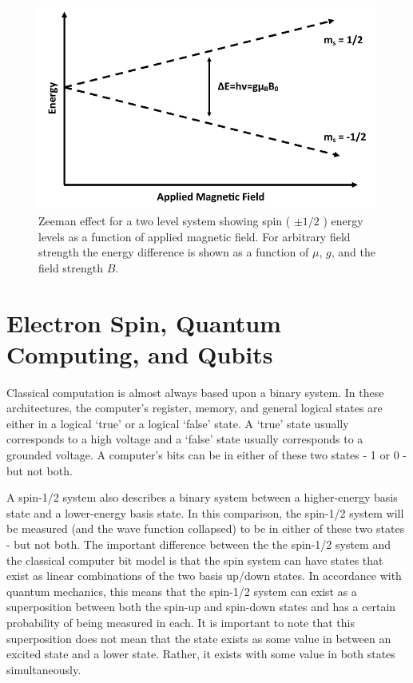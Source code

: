 \documentclass[oneside, noacknowlegments]{BYUPhys}
\begin{document}
\begin{figure}
    \centerline{\includegraphics{zeeman_fig}}
    \caption[Zeeman Effect and Resonant Conditions in Matter]{\label{fig:Zeeman}
     Zeeman effect for a two level system showing spin ( $\pm 1/2$ ) energy levels as a function of applied magnetic field. For arbitrary field strength the energy difference is shown as a function of $\mu$, $g$, and the field strength $B$.}
\end{figure}

\section{Electron Spin, Quantum Computing, and Qubits}

Classical computation is almost always based upon a binary system. In these architectures, the computer's register, memory, and general logical states are either in a logical `true' or a logical `false' state. A `true' state usually corresponds to a high voltage and a `false' state usually corresponds to a grounded voltage. A computer's bits can be in either of these two states - 1 or 0 - but not both.

A spin-1/2 system also describes a binary system between a higher-energy basis state and a lower-energy basis state. In this comparison, the spin-1/2 system will be measured (and the wave function collapsed) to be in either of these two states - but not both. The important difference between the the spin-1/2 system and the classical computer bit model is that the spin system can have states that exist as linear combinations of the two basis up/down states. In accordance with quantum mechanics, this means that the spin-1/2 system can exist as a superposition between both the spin-up and spin-down states and has a certain probability of being measured in each. It is important to note that this superposition does not mean that the state exists as some value in between an excited state and a lower state. Rather, it exists with some value in both states simultaneously.
\end{document}
